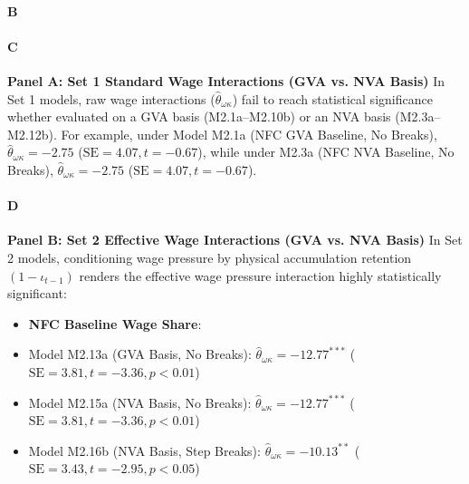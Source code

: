 







\paragraph{B}

\paragraph{C}
\textbf{Panel A: Set 1 Standard Wage Interactions (GVA vs. NVA Basis)}
In Set 1 models, raw wage interactions ($\hat{\theta}_{\omega\kappa}$) fail to reach statistical significance whether evaluated on a GVA basis (M2.1a–M2.10b) or an NVA basis (M2.3a–M2.12b). For example, under Model M2.1a (NFC GVA Baseline, No Breaks), $\hat{\theta}_{\omega\kappa} = -2.75$ ($\text{SE} = 4.07, t = -0.67$), while under M2.3a (NFC NVA Baseline, No Breaks), $\hat{\theta}_{\omega\kappa} = -2.75$ ($\text{SE} = 4.07, t = -0.67$).

\paragraph{D}
\textbf{Panel B: Set 2 Effective Wage Interactions (GVA vs. NVA Basis)}
In Set 2 models, conditioning wage pressure by physical accumulation retention $(1-\iota_{t-1})$ renders the effective wage pressure interaction highly statistically significant:

\begin{itemize}
	\item \textbf{NFC Baseline Wage Share}:
	\item Model M2.13a (GVA Basis, No Breaks): $\hat{\theta}_{\omega\kappa} = -12.77^{***}$ ($\text{SE} = 3.81, t = -3.36, p < 0.01$)
	\item Model M2.15a (NVA Basis, No Breaks): $\hat{\theta}_{\omega\kappa} = -12.77^{***}$ ($\text{SE} = 3.81, t = -3.36, p < 0.01$)
	\item Model M2.16b (NVA Basis, Step Breaks): $\hat{\theta}_{\omega\kappa} = -10.13^{**}$ ($\text{SE} = 3.43, t = -2.95, p < 0.05$)
\end{itemize}

